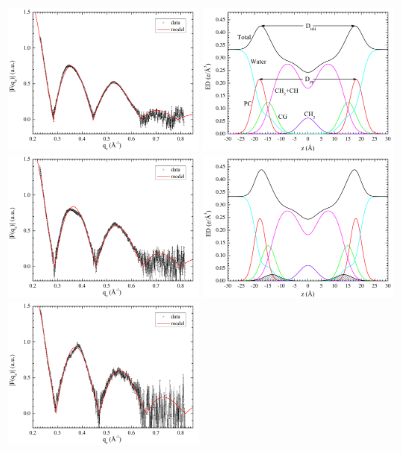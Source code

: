\begin{figure}[htbp]
  \centering
  \includegraphics[width=0.45\textwidth,valign=t]{figures/Tat/SDP_Results/XFF/DOPC_XFF1} 
  \includegraphics[width=0.45\textwidth,valign=t]{figures/Tat/SDP_Results/EDP/DOPC_EDP1} 
  \includegraphics[width=0.45\textwidth,valign=t]{figures/Tat/SDP_Results/XFF/DOPC_Tat_62to1_3p0_XFF1}
  \includegraphics[width=0.45\textwidth,valign=t]{figures/Tat/SDP_Results/EDP/DOPC_Tat_62to1_3p0_EDP1} 
  \includegraphics[width=0.45\textwidth,valign=t]{figures/Tat/SDP_Results/XFF/DOPC_Tat_28to1_3p0_XFF1}

\end{figure}
